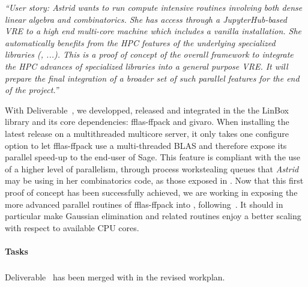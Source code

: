 \emph{“User story: Astrid wants to run compute intensive routines
    involving both dense linear algebra and combinatorics. She has
    access through a JupyterHub-based VRE to a high end multi-core
    machine which includes a vanilla \Sage installation. She
    automatically benefits from the HPC features of the underlying
    specialized libraries (\Linbox, ...). This is a proof of concept
    of the overall framework to integrate the HPC advances of
    specialized libraries into a general purpose VRE.
    It will prepare the final integration of a broader set of such
    parallel features for the end of the project.”}

With Deliverable~, we developped, released and integrated in the
\Sage the LinBox library and its core dependencies: fflas-ffpack and givaro.
When installing the latest \Sage release on a multithreaded multicore server, it
only takes one configure option to let fflas-ffpack use a multi-threaded BLAS
and therefore expose its parallel speed-up to the end-user of Sage. This feature
is compliant with the use of a higher level of parallelism, through process
workstealing queues that \textit{Astrid} may be using in her combinatorics code, as those
exposed in . Now that this first proof of concept has been
successfully achieved, we are working in exposing the more advanced parallel
routines of fflas-ffpack into \Sage, following~. It
should in particular make Gaussian elimination and related routines enjoy a
better scaling with respect to available CPU cores.

\paragraph{Tasks}

\subparagraph{}
Deliverable~ has been merged
 with  in the revised workplan.

